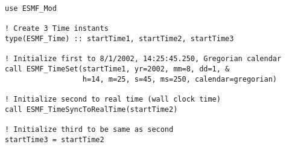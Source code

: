 
\begin{verbatim}
use ESMF_Mod

! Create 3 Time instants
type(ESMF_Time) :: startTime1, startTime2, startTime3

! Initialize first to 8/1/2002, 14:25:45.250, Gregorian calendar
call ESMF_TimeSet(startTime1, yr=2002, mm=8, dd=1, &
                  h=14, m=25, s=45, ms=250, calendar=gregorian)

! Initialize second to real time (wall clock time)
call ESMF_TimeSyncToRealTime(startTime2)

! Initialize third to be same as second
startTime3 = startTime2

\end{verbatim}
